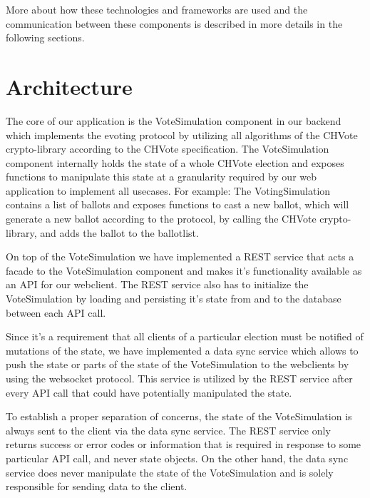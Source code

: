 More about how these technologies and frameworks are used and the communication between these components is described in more details in the following sections.

\section{Architecture}
The core of our application is the VoteSimulation component in our backend which implements the evoting protocol by utilizing all algorithms of the CHVote crypto-library according to the CHVote specification. The VoteSimulation component internally holds the state of a whole CHVote election and exposes functions to manipulate this state at a granularity required by our web application to implement all usecases. For example: The VotingSimulation contains a list of ballots and exposes functions to cast a new ballot, which will generate a new ballot according to the protocol, by calling the CHVote crypto-library, and adds the ballot to the ballotlist.

On top of the VoteSimulation we have implemented a REST service that acts a facade to the VoteSimulation component and makes it's functionality available as an API for our webclient. The REST service also has to initialize the VoteSimulation by loading and persisting it's state from and to the database between each API call.

Since it's a requirement that all clients of a particular election must be notified of mutations of the state, we have implemented a data sync service which allows to push the state or parts of the state of the VoteSimulation to the webclients by using the websocket protocol. This service is utilized by the REST service after every API call that could have potentially manipulated the state.

To establish a proper separation of concerns, the state of the VoteSimulation is always sent to the client via the data sync service. The REST service only returns success or error codes or information that is required in response to some particular API call, and never state objects. On the other hand, the data sync service does never manipulate the state of the VoteSimulation and is solely responsible for sending data to the client.

